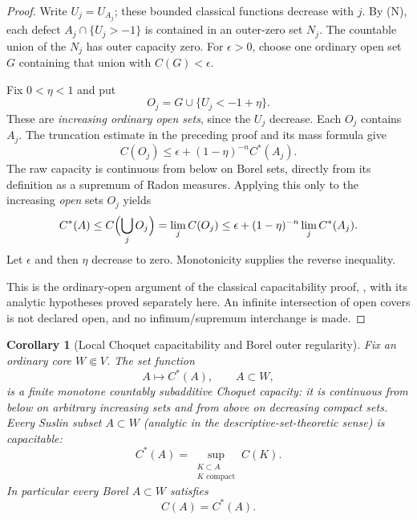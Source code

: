 \documentclass[11pt,a4paper]{article}
\numberwithin{equation}{section}
\newtheorem{corollary}[theorem]{Corollary}
\theoremstyle{definition}
\theoremstyle{remark}
\begin{document}
\begin{proof}
Write $U_j=U_{A_j}$; these bounded classical functions decrease
with $j$. By \textup{(N)}, each defect
$A_j\cap\{U_j>-1\}$ is contained in an outer-zero set $N_j$.
The countable union of the $N_j$ has outer capacity zero.
For $\epsilon>0$, choose one ordinary open set $G$ containing
that union with $C(G)<\epsilon$.

Fix $0<\eta<1$ and put
\[
 O_j=G\cup\{U_j<-1+\eta\}.
\]
These are \emph{increasing ordinary open sets}, since the $U_j$
decrease. Each $O_j$ contains $A_j$. The truncation estimate in
the preceding proof and its mass formula give
\[
 C(O_j)\leq\epsilon+
      (1-\eta)^{-n}C^*(A_j).
\]
The raw capacity is continuous from below on Borel sets, directly
from its definition as a supremum of Radon measures. Applying
this only to the increasing \emph{open} sets $O_j$ yields
\[
 C^*(A)\leq C\Bigl(\bigcup_jO_j\Bigr)
       =\lim_j C(O_j)
       \leq\epsilon+(1-\eta)^{-n}\lim_j C^*(A_j).
\]
Let $\epsilon$ and then $\eta$ decrease to zero. Monotonicity
supplies the reverse inequality.

This is the ordinary-open argument of the classical capacitability
proof, \cite[\S8, Theorem 8.2]{BT82}, with its analytic hypotheses
proved separately here. An infinite intersection of open covers is
not declared open, and no infimum/supremum interchange is made.
\end{proof}

\begin{corollary}[Local Choquet capacitability and Borel outer regularity]
\label{cor:r2-local-choquet}
Fix an ordinary core $W\Subset V$. The set function
\[
 A\longmapsto C^*(A),\qquad A\subset W,
\]
is a finite monotone countably subadditive Choquet capacity: it is
continuous from below on arbitrary increasing sets and from above
on decreasing compact sets. Every Suslin subset $A\subset W$
(analytic in the descriptive-set-theoretic sense) is capacitable:
\[
 C^*(A)=\sup_{\substack{K\subset A\\K\text{ compact}}}C(K).
\]
In particular every Borel $A\subset W$ satisfies
\[
 C(A)=C^*(A).
\]
\end{corollary}
\end{document}
